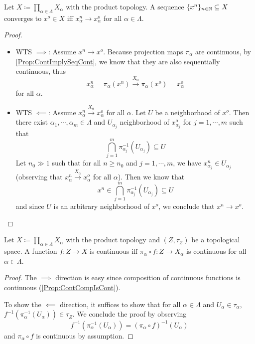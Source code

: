 \documentclass[screen]{techreport}
\numberwithin{equation}{section}
\begin{document}
\begin{lemma}\label{Lem:ProdTopSeqConvergeIffEveryAxisConverge}
	Let $X \coloneqq \prod_{\alpha \in \Lambda} X_\alpha$ with the product topology.
	A sequence $\{x^n\}_{n \in \mathbb{N}} \subseteq X$ converges to $x^o \in X$ iff $x^n_\alpha \rightarrow x^o_\alpha$ for all $\alpha \in \Lambda$.
\end{lemma}
\begin{proof}\
	\begin{itemize}
		\item WTS $\implies$: Assume $x^n \rightarrow x^o$.
		Because projection maps $\pi_\alpha$ are continuous, by \cref{Prop:ContImplySeqCont}, we know that they are also sequentially continuous, thus
		\[
		x^n_\alpha = \pi_\alpha(x^n) \xrightarrow{X_\alpha} \pi_\alpha(x^o) = x^o_\alpha
		\]
		for all $\alpha$.
		
		\item WTS $\impliedby$: Assume $x^n_\alpha \xrightarrow{X_\alpha} x^o_\alpha$ for all $\alpha$.
		Let $U$ be a neighborhood of $x^o$.
		Then there exist $\alpha_1,\cdots,\alpha_m \in \Lambda$ and  $U_{\alpha_j}$ neighborhood of $x^o_{\alpha_j}$ for $j=1,\cdots,m$ such that
		\[
		\bigcap_{j=1}^m \pi_{\alpha_j}^{-1}(U_{\alpha_j}) \subseteq U
		\]
		Let $n_0 \gg 1$ such that for all $n \ge n_0$ and $j=1,\cdots,m$, we have $x^n_{\alpha_j} \in U_{\alpha_j}$ (observing that $x^n_\alpha \xrightarrow{X_\alpha} x^o_\alpha$ for all $\alpha$).
		Then we know that
		\[
		x^n \in \bigcap_{j=1}^m \pi_{\alpha_j}^{-1}(U_{\alpha_j}) \subseteq U
		\]
		and since $U$ is an arbitrary neighborhood of $x^o$, we conclude that $x^n \rightarrow x^o$.
	\end{itemize}
\end{proof}

\begin{lemma}\label{Lem:ProdTopContFuncIffContEveryAxis}
	Let $X \coloneqq \prod_{\alpha \in \Lambda} X_\alpha$ with the product topology and $(Z,\tau_Z)$ be a topological space.
	A function $f :Z \to X$ is continuous iff $\pi_\alpha \circ f : Z \to X_\alpha$ is continuous for all $\alpha \in \Lambda$.
\end{lemma}
\begin{proof}
	The $\implies$ direction is easy since composition of continuous functions is continuous (\cref{Prop:ContCompIsCont}).
	
	To show the $\impliedby$ direction, it suffices to show that for all $\alpha \in \Lambda$ and $U_\alpha \in \tau_\alpha$, $f^{-1}(\pi_\alpha^{-1}(U_\alpha)) \in \tau_Z$.
	We conclude the proof by observing
	\[
	f^{-1}(\pi_\alpha^{-1}(U_\alpha)) = (\pi_\alpha \circ f)^{-1}(U_\alpha)
	\]
	and $\pi_\alpha \circ f$ is continuous by assumption.
\end{proof}
\end{document}
